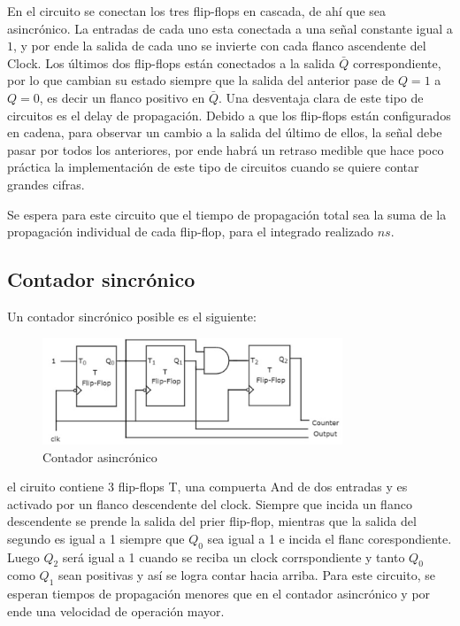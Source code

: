 En el circuito se conectan los tres flip-flops en cascada, de ahí que sea asincrónico. La entradas de cada uno esta conectada a una señal constante igual a $1$, y por ende la salida de cada uno se invierte con cada flanco ascendente del Clock. Los últimos dos flip-flops están conectados a la salida $\bar{Q}$ correspondiente, por lo que cambian su estado siempre que la salida del anterior pase de $Q = 1$ a $Q = 0$, es decir un flanco positivo en $\bar{Q}$. Una desventaja clara de este tipo de circuitos es el delay de propagación. Debido a que los flip-flops están configurados en cadena, para observar un cambio a la salida del último de ellos, la señal debe pasar por todos los anteriores, por ende habrá un retraso medible que hace poco práctica la implementación de este tipo de circuitos cuando se quiere contar grandes cifras. 


Se espera para este circuito que el tiempo de propagaci\'on total sea la suma de la propagaci\'on individual de cada flip-flop, para el integrado realizado $ns$.


\subsection{Contador sincrónico}

Un contador sincr\'onico posible es el siguiente:


\begin{figure}[H]
	\centering
	\includegraphics[width=0.8\textwidth]{Ejercicio7/Recursos/sincronico}
	\caption{Contador asincrónico}
\end{figure}

el ciruito contiene 3 flip-flops T, una compuerta And de dos entradas y es activado por un flanco descendente del clock. Siempre que incida un  flanco descendente se prende la salida del prier flip-flop, mientras que la salida del segundo es igual a 1 siempre que $Q_0$ sea igual a 1 e incida el flanc corespondiente. Luego $Q_2$ ser\'a igual a 1 cuando se reciba un clock corrspondiente y tanto $Q_0$ como $Q_1$ sean positivas y as\'i se logra contar hacia arriba. Para este circuito, se esperan tiempos de propagaci\'on menores que en el contador asincr\'onico y por ende una velocidad de operaci\'on mayor. 

